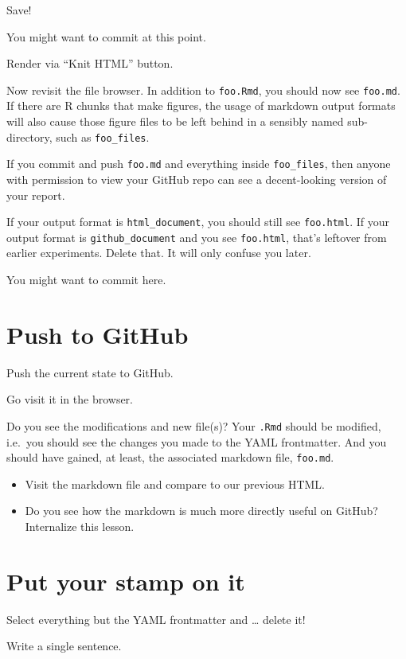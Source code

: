 \documentclass[
]{book}
\providecommand{\tightlist}{%
  \setlength{\itemsep}{0pt}\setlength{\parskip}{0pt}}
\begin{document}
Save!

You might want to commit at this point.

Render via ``Knit HTML'' button.

Now revisit the file browser.
In addition to \texttt{foo.Rmd}, you should now see \texttt{foo.md}.
If there are R chunks that make figures, the usage of markdown output formats will also cause those figure files to be left behind in a sensibly named sub-directory, such as \texttt{foo\_files}.

If you commit and push \texttt{foo.md} and everything inside \texttt{foo\_files}, then anyone with permission to view your GitHub repo can see a decent-looking version of your report.

If your output format is \texttt{html\_document}, you should still see \texttt{foo.html}.
If your output format is \texttt{github\_document} and you see \texttt{foo.html}, that's leftover from earlier experiments.
Delete that.
It will only confuse you later.

You might want to commit here.

\section{Push to GitHub}\label{push-to-github-1}

Push the current state to GitHub.

Go visit it in the browser.

Do you see the modifications and new file(s)?
Your \texttt{.Rmd} should be modified, i.e.~you should see the changes you made to the YAML frontmatter.
And you should have gained, at least, the associated markdown file, \texttt{foo.md}.

\begin{itemize}
\tightlist
\item
  Visit the markdown file and compare to our previous HTML.
\item
  Do you see how the markdown is much more directly useful on GitHub?
  Internalize this lesson.
\end{itemize}

\section{Put your stamp on it}\label{put-your-stamp-on-it}

Select everything but the YAML frontmatter and \ldots{} delete it!

Write a single sentence.
\end{document}
